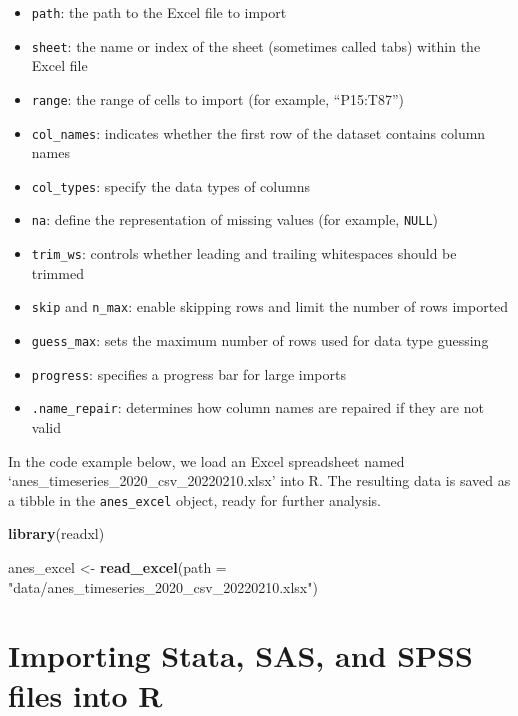 \documentclass[
]{krantz}
\makeatletter
\newenvironment{Shaded}{\begin{snugshade}}{\end{snugshade}}
\newcommand{\AttributeTok}[1]{\textcolor[rgb]{0.27,0.27,0.27}{#1}}
\newcommand{\FunctionTok}[1]{\textcolor[rgb]{0.27,0.27,0.27}{\textbf{#1}}}
\newcommand{\NormalTok}[1]{#1}
\newcommand{\OtherTok}[1]{\textcolor[rgb]{0.37,0.37,0.37}{#1}}
\newcommand{\StringTok}[1]{\textcolor[rgb]{0.5,0.5,0.5}{#1}}
\providecommand{\tightlist}{%
  \setlength{\itemsep}{0pt}\setlength{\parskip}{0pt}}
\newenvironment{kframe}{%
\medskip{}
\setlength{\fboxsep}{.8em}
 \def\at@end@of@kframe{}%
 \ifinner\ifhmode%
  \def\at@end@of@kframe{\end{minipage}}%
  \begin{minipage}{\columnwidth}%
 \fi\fi%
 \def\FrameCommand##1{\hskip\@totalleftmargin \hskip-\fboxsep
 \colorbox{shadecolor}{##1}\hskip-\fboxsep
     \hskip-\linewidth \hskip-\@totalleftmargin \hskip\columnwidth}%
 \MakeFramed {\advance\hsize-\width
   \@totalleftmargin\z@ \linewidth\hsize
   \@setminipage}}%
 {\par\unskip\endMakeFramed%
 \at@end@of@kframe}
\renewenvironment{Shaded}{\begin{kframe}}{\end{kframe}}
\makeatother
\begin{document}
\begin{itemize}
\tightlist
\item
  \texttt{path}: the path to the Excel file to import
\item
  \texttt{sheet}: the name or index of the sheet (sometimes called tabs) within the Excel file
\item
  \texttt{range}: the range of cells to import (for example, ``P15:T87'')
\item
  \texttt{col\_names}: indicates whether the first row of the dataset contains column names
\item
  \texttt{col\_types}: specify the data types of columns
\item
  \texttt{na}: define the representation of missing values (for example, \texttt{NULL})
\item
  \texttt{trim\_ws}: controls whether leading and trailing whitespaces should be trimmed
\item
  \texttt{skip} and \texttt{n\_max}: enable skipping rows and limit the number of rows imported
\item
  \texttt{guess\_max}: sets the maximum number of rows used for data type guessing
\item
  \texttt{progress}: specifies a progress bar for large imports
\item
  \texttt{.name\_repair}: determines how column names are repaired if they are not valid
\end{itemize}

In the code example below, we load an Excel spreadsheet named `anes\_timeseries\_2020\_csv\_20220210.xlsx' into R. The resulting data is saved as a tibble in the \texttt{anes\_excel} object, ready for further analysis.

\begin{Shaded}
\begin{Highlighting}[]
\FunctionTok{library}\NormalTok{(readxl)}

\NormalTok{anes\_excel }\OtherTok{\textless{}{-}}
  \FunctionTok{read\_excel}\NormalTok{(}\AttributeTok{path =} \StringTok{"data/anes\_timeseries\_2020\_csv\_20220210.xlsx"}\NormalTok{)}
\end{Highlighting}
\end{Shaded}

\hypertarget{importing-stata-sas-and-spss-files-into-r}{%
\section{Importing Stata, SAS, and SPSS files into R}\label{importing-stata-sas-and-spss-files-into-r}}
\end{document}
